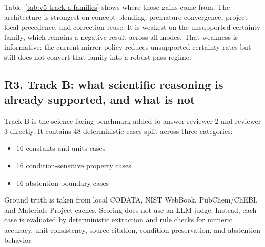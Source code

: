 \documentclass[12pt]{article}
\begin{document}
\begin{table}[H]
\centering
{}
\caption{Table 3. Track A family-level pass rates. Each family contains five theme variants.}
\label{tab:v5-track-a-families}
\end{table}

Table~\ref{tab:v5-track-a-families} shows where those gains come from. The architecture is strongest on concept blending, premature convergence, project-local precedence, and correction reuse. It is weakest on the unsupported-certainty family, which remains a negative result across all modes. That weakness is informative: the current mirror policy reduces unsupported certainty rates but still does not convert that family into a robust pass regime.

\subsection{R3. Track B: what scientific reasoning is already supported, and what is not}

Track B is the science-facing benchmark added to answer reviewer 2 and reviewer 3 directly. It contains 48 deterministic cases split across three categories:
\begin{itemize}
\item 16 constants-and-units cases
\item 16 condition-sensitive property cases
\item 16 abstention-boundary cases
\end{itemize}
Ground truth is taken from local CODATA, NIST WebBook, PubChem/ChEBI, and Materials Project caches. Scoring does not use an LLM judge. Instead, each case is evaluated by deterministic extraction and rule checks for numeric accuracy, unit consistency, source citation, condition preservation, and abstention behavior.
\end{document}
